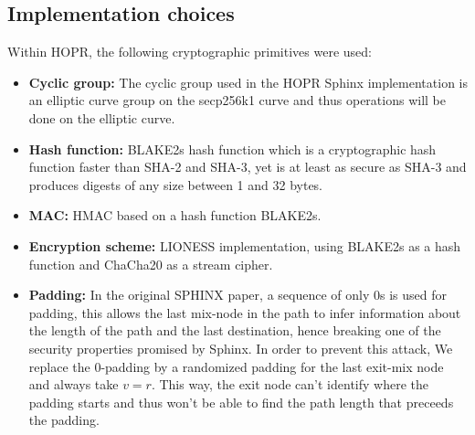 \subsection{Implementation choices}
Within HOPR, the following cryptographic primitives were used:
\begin{itemize}
    \item \textbf{Cyclic group:} The cyclic group used in the HOPR Sphinx implementation is an elliptic curve group on the secp256k1 curve and thus operations will be done on the elliptic curve.
    \item \textbf{Hash function:} BLAKE2s hash function which is a cryptographic hash function faster than SHA-2 and SHA-3, yet is at least as secure as SHA-3 and produces digests of any size between 1 and 32 bytes.
    \item \textbf{MAC:} HMAC based on a hash function BLAKE2s.
    \item \textbf{Encryption scheme:} LIONESS \cite{lionesspaper} implementation, using BLAKE2s as a hash function and ChaCha20 as a stream cipher.
    \item \textbf{Padding:} In the original SPHINX paper, a sequence of only 0s is used for padding, this allows the last mix-node in the path to infer information about the length of the path and the last destination, hence breaking one of the security properties promised by Sphinx. In order to prevent this attack, We replace the 0-padding by a randomized padding for the last exit-mix node and always take $v=r$. This way, the exit node can't identify where the padding starts and thus won't be able to find the path length that preceeds the padding.
\end{itemize}





